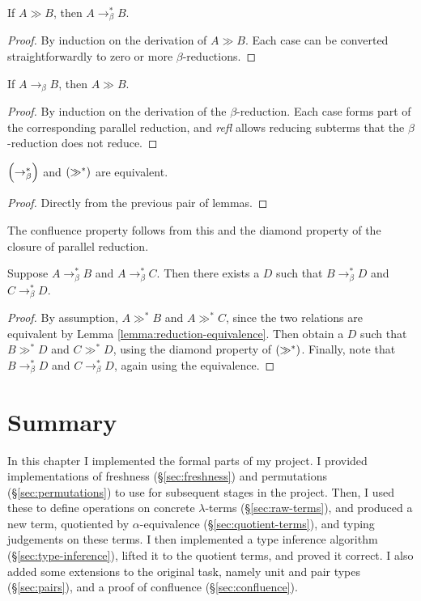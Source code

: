 \begin{lemma}
If \(A \gg B\), then \(A \to_\beta^* B\).
\end{lemma}
\begin{proof}
By induction on the derivation of \(A \gg B\).
Each case can be converted straightforwardly to zero or more \(\beta\)-reductions.
\end{proof}

\begin{lemma}
If \(A \to_\beta B\), then \(A \gg B\).
\end{lemma}
\begin{proof}
By induction on the derivation of the \(\beta\)-reduction.
Each case forms part of the corresponding parallel reduction, and \emph{refl} allows reducing subterms that the \(\beta\)-reduction does not reduce.
\end{proof}

\begin{lemma}
\label{lemma:reduction-equivalence}
\(\left(\to_\beta^*\right)\) and \(\left(\gg^*\right)\) are equivalent.
\end{lemma}
\begin{proof}
Directly from the previous pair of lemmas.
\end{proof}

The confluence property follows from this and the diamond property of the closure of parallel reduction.

\begin{theorem}
Suppose \(A \to_\beta^* B\) and \(A \to_\beta^* C\).
Then there exists a \(D\) such that \(B \to_\beta^* D\) and \(C \to_\beta^* D\).
\end{theorem}
\begin{proof}
By assumption, \(A \gg^* B\) and \(A \gg^* C\), since the two relations are equivalent by Lemma \ref{lemma:reduction-equivalence}.
Then obtain a \(D\) such that \(B \gg^* D\) and \(C \gg^* D\), using the diamond property of \(\left(\gg^*\right)\).
Finally, note that \(B \to_\beta^* D\) and \(C \to_\beta^* D\), again using the equivalence.
\end{proof}

\section{Summary}
In this chapter I implemented the formal parts of my project.
I provided implementations of freshness (\S\ref{sec:freshness}) and permutations (\S\ref{sec:permutations}) to use for subsequent stages in the project.
Then, I used these to define operations on concrete \(\lambda\)-terms (\S\ref{sec:raw-terms}), and produced a new term, quotiented by \(\alpha\)-equivalence (\S\ref{sec:quotient-terms}), and typing judgements on these terms.
I then implemented a type inference algorithm (\S\ref{sec:type-inference}), lifted it to the quotient terms, and proved it correct.
I also added some extensions to the original task, namely unit and pair types (\S\ref{sec:pairs}), and a proof of confluence (\S\ref{sec:confluence}).
